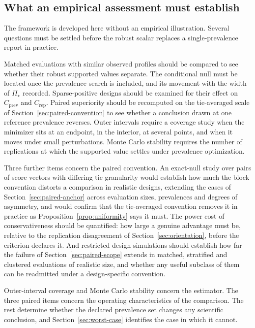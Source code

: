 \documentclass[11pt]{article}
\newcommand{\PSet}{\Pi_\star}
\theoremstyle{remark}
\begin{document}
\subsection{What an empirical assessment must establish}

The framework is developed here without an empirical illustration. Several questions must be settled before the robust scalar replaces a single-prevalence report in practice.

Matched evaluations with similar observed profiles should be compared to see whether their robust supported values separate. The conditional null must be located once the prevalence search is included, and its movement with the width of $\PSet$ recorded. Sparse-positive designs should be examined for their effect on $C_{\mathrm{prev}}$ and $C_{\mathrm{rep}}$. Paired superiority should be recomputed on the tie-averaged scale of Section~\ref{sec:paired-convention} to see whether a conclusion drawn at one reference prevalence reverses. Outer intervals require a coverage study when the minimizer sits at an endpoint, in the interior, at several points, and when it moves under small perturbations. Monte Carlo stability requires the number of replications at which the supported value settles under prevalence optimization.

Three further items concern the paired convention. An exact-null study over pairs of score vectors with differing tie granularity would establish how much the block convention distorts a comparison in realistic designs, extending the cases of Section~\ref{sec:paired-anchor} across evaluation sizes, prevalences and degrees of asymmetry, and would confirm that the tie-averaged convention removes it in practice as Proposition~\ref{prop:uniformity} says it must. The power cost of conservativeness should be quantified: how large a genuine advantage must be, relative to the replication disagreement of Section~\ref{sec:orientation}, before the criterion declares it. And restricted-design simulations should establish how far the failure of Section~\ref{sec:paired-scope} extends in matched, stratified and clustered evaluations of realistic size, and whether any useful subclass of them can be readmitted under a design-specific convention.

Outer-interval coverage and Monte Carlo stability concern the estimator. The three paired items concern the operating characteristics of the comparison. The rest determine whether the declared prevalence set changes any scientific conclusion, and Section~\ref{sec:worst-case} identifies the case in which it cannot.
\end{document}
